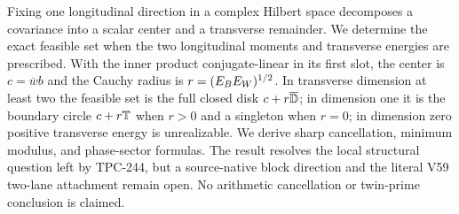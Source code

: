 Fixing one longitudinal direction in a complex Hilbert space decomposes a
covariance into a scalar center and a transverse remainder.  We determine the
exact feasible set when the two longitudinal moments and transverse energies
are prescribed.  With the inner product conjugate-linear in its first slot, the
center is $c=\overline w b$ and the Cauchy radius is
$r=(E_BE_W)^{1/2}$.  In transverse dimension at least two the feasible set is
the full closed disk $c+r\overline{\mathbb{D}}$; in dimension one it is the boundary circle
$c+r\mathbb{T}$ when $r>0$ and a singleton when $r=0$; in dimension zero positive
transverse energy is unrealizable.  We derive sharp cancellation, minimum
modulus, and phase-sector formulas.  The result resolves the local structural
question left by TPC-244, but a source-native block direction and the literal
V59 two-lane attachment remain open.  No arithmetic cancellation or twin-prime
conclusion is claimed.
